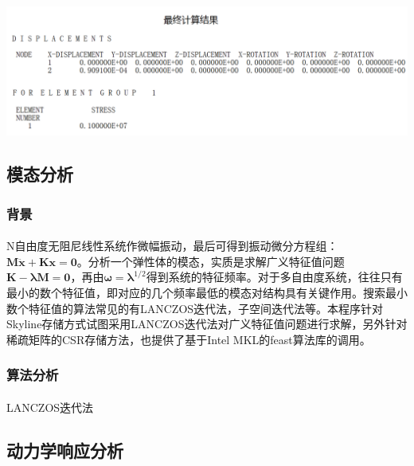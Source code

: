 \documentclass[UTF8]{ctexbook}
\begin{document}
\begin{center}
\includegraphics[width=1.0\textwidth]{plastic6.png}
\end{center}
\subsection{模态分析}
\subsubsection{背景}
\paragraph{}
N自由度无阻尼线性系统作微幅振动，最后可得到振动微分方程组：$\boldsymbol{M\ddot x+Kx=0}$。分析一个弹性体的模态，实质是求解广义特征值问题$\boldsymbol{K-\lambda M=0}$，再由$\boldsymbol{\omega =\lambda}^{1/2}$得到系统的特征频率。对于多自由度系统，往往只有最小的数个特征值，即对应的几个频率最低的模态对结构具有关键作用。搜索最小数个特征值的算法常见的有LANCZOS迭代法，子空间迭代法等。本程序针对Skyline存储方式试图采用LANCZOS迭代法对广义特征值问题进行求解，另外针对稀疏矩阵的CSR存储方法，也提供了基于Intel MKL的feast算法库的调用。
\subsubsection{算法分析}
\paragraph{}
LANCZOS迭代法


\subsection{动力学响应分析}
\end{document}
